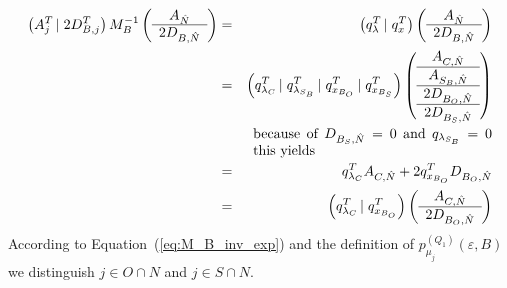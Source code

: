 \documentclass[a4paper]{article}
\newcommand{\pmu}[2]{\ensuremath{p_{\mu_{j}}^{(#1)}(\varepsilon, #2)}}
\begin{document}
\begin{eqnarray}
    \left(A_{j}^{T} \left| \right. 2D_{B, j}^{T} \right)
    M_{B}^{-1}
    \left(\begin{array}{c}
            A_{\hat{N}} \\
	    \hline
	    2D_{B,\hat{N}}
	  \end{array}
    \right)
&=&
    \left(q_{\lambda}^{T} \left| \right. q_{x}^{T} \right)
    \left(\begin{array}{c}
            A_{\hat{N}} \\
	    \hline
	    2D_{B,\hat{N}}
	  \end{array}
    \right)
\nonumber \\
&=&
\left(q_{\lambda_{C}}^{T}\left|\right.
      q_{\lambda_{S_{B}}}^{T}\left|\right.
      q_{x_{B_{O}}}^{T}\left|\right.
      q_{x_{B_{S}}}^{T}
\right)
\left(\begin{array}{c}
        A_{C, \hat{N}} \\
	\hline
	A_{S_{B}, \hat{N}} \\
	\hline
	2D_{B_{O}, \hat{N}} \\
	\hline
	2D_{B_{S}, \hat{N}}
      \end{array}
\right)
\nonumber \\
&&\begin{minipage}{6cm}
because of $D_{B_{S}, \hat{N}}=0$ and $q_{\lambda_{S_{B}}}=0$ this yields
\end{minipage}
\nonumber \\
&=&
q_{\lambda_{C}}^{T}A_{C, \hat{N}} + 2q_{x_{B_{O}}}^{T}D_{B_{O},\hat{N}}
\nonumber \\
&=&
\left(q_{\lambda_{C}}^{T}\left|\right.q_{x_{B_{O}}}^{T}\right)
\left(\begin{array}{c}
        A_{C, \hat{N}} \\
	\hline
	2D_{B_{O}, \hat{N}}
      \end{array}
\right)                         
\end{eqnarray}
According to Equation~(\ref{eq:M_B_inv_exp}) and the definition of
\pmu{Q_{1}}{B} we distinguish $j \in O \cap N$ and
$j \in S \cap N$.
\end{document}
